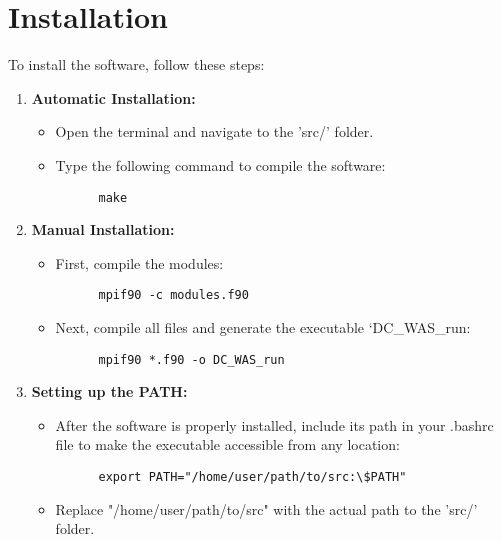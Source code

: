 \documentclass[11pt, oneside]{article}   	%
\begin{document}
\section{Installation}\label{sec2}

To install the software, follow these steps:

\begin{enumerate}

  \item \textbf{Automatic Installation:}
    \begin{itemize}
      \item Open the terminal and navigate to the '{src/}' folder.
      \item Type the following command to compile the software:\\
        \begin{verbatim}
      make
        \end{verbatim}

    \end{itemize}

  \item \textbf{Manual Installation:}
    \begin{itemize}
      \item First, compile the modules:\\
        \begin{verbatim}
      mpif90 -c modules.f90
  \end{verbatim}

      \item Next, compile all files and generate the executable `DC\_WAS\_run:\\
        \begin{verbatim}
      mpif90 *.f90 -o DC_WAS_run	
        \end{verbatim}

    \end{itemize}

  \item \textbf{Setting up the PATH:}
    \begin{itemize}
      \item After the software is properly installed, include its path in your .bashrc file 
      to make the executable accessible from any location:\\
        \begin{verbatim}
      export PATH="/home/user/path/to/src:\$PATH"
        \end{verbatim}
    \item Replace "/home/user/path/to/src" with the actual path to the '{src/}' folder.
    \end{itemize}
    
\end{enumerate}
\end{document}
